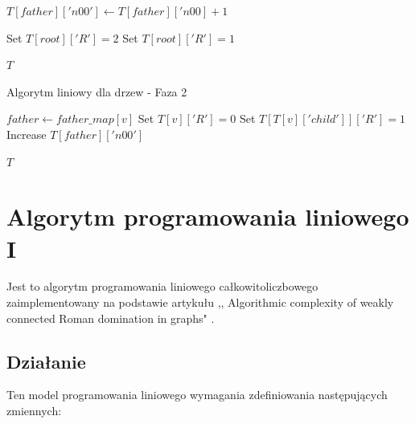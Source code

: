 \begin{algorithm}
\begin{algorithmic}[1]
                        \State $T[father]['n00'] \gets T[father]['n00] + 1$
                    \EndIf

                \EndIf
            \EndFor
    
                \State Set $T[root]['R'] = 2$
            \EndIf
                \State Set $T[root]['R'] = 1$
            \EndIf
    
            \State \Return $T$
        \EndFunction
    \end{algorithmic}
    \end{algorithm}
    
    \begin{algorithm}
    \caption*{Algorytm liniowy dla drzew - Faza 2}
    \begin{algorithmic}[1]
                \State $father \gets father\_map[v]$
                        \State Set $T[v]['R'] = 0$
                        \State Set $T[T[v]['child']]['R'] = 1$
                        \State Increase $T[father]['n00']$
                    \EndIf
                \EndIf
            \EndFor
    
            \State \Return $T$
        \EndFunction
    \end{algorithmic}
\end{algorithm}

\FloatBarrier
\section{Algorytm programowania liniowego I}
Jest to algorytm programowania liniowego całkowitoliczbowego zaimplementowany na podstawie artykułu ,, Algorithmic complexity of weakly connected Roman domination in graphs" \cite{ILP}.

\subsection{Działanie}

Ten model programowania liniowego wymagania zdefiniowania następujących zmiennych:

